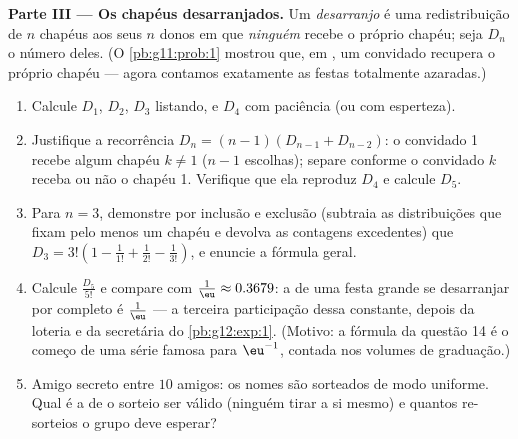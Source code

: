 \begin{problem}
\medskip
\noindent\textbf{Parte III --- Os chapéus desarranjados.}
Um \emph{desarranjo} é uma redistribuição de $n$ chapéus aos seus
$n$ donos em que \emph{ninguém} recebe o próprio chapéu; seja
$D_n$ o número deles. (O \cref{pb:g11:prob:1} mostrou que, em
, um convidado recupera o próprio chapéu --- agora contamos
exatamente as festas totalmente azaradas.)
\begin{enumerate}[resume]
  \item Calcule $D_1$, $D_2$, $D_3$ listando, e $D_4$ com
        paciência (ou com esperteza).
  \item Justifique a recorrência
        $D_n = (n - 1)\left(D_{n-1} + D_{n-2}\right)$: o
        convidado 1 recebe algum chapéu $k \neq 1$ ($n - 1$
        escolhas); separe conforme o convidado $k$ receba ou não
        o chapéu 1. Verifique que ela reproduz $D_4$ e calcule
        $D_5$.
  \item Para $n = 3$, demonstre por inclusão e exclusão
        (subtraia as distribuições que fixam pelo menos um
        chapéu e devolva as contagens excedentes) que
        $D_3 = 3!\left(1 - \frac{1}{1!} + \frac{1}{2!} -
        \frac{1}{3!}\right)$, e enuncie a fórmula geral.
  \item Calcule $\frac{D_5}{5!}$ e compare com
        $\frac1\eu \approx 0.3679$: a  de uma festa
        grande se desarranjar por completo é $\frac1\eu$ --- a
        terceira participação dessa constante, depois da loteria
        e da secretária do \cref{pb:g12:exp:1}. (Motivo: a
        fórmula da questão 14 é o começo de uma série famosa para
        $\eu^{-1}$, contada nos volumes de graduação.)
  \item Amigo secreto entre $10$ amigos: os nomes são sorteados
        de modo uniforme. Qual é a  de o sorteio ser
        válido (ninguém tirar a si mesmo) e quantos re-sorteios o
        grupo deve esperar?
\end{enumerate}


\end{problem}
